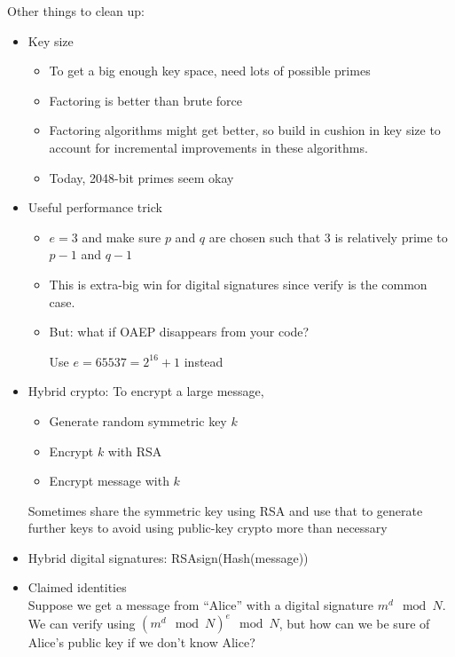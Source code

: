 Other things to clean up:
\begin{itemize}
    \item Key size
    \begin{itemize}
        \item To get a big enough key space, need lots of possible primes
        \item Factoring is better than brute force
        \item Factoring algorithms might get better, so build in cushion in key
            size to account for incremental improvements in these algorithms.
        \item Today, 2048-bit primes seem okay
    \end{itemize}
    \item Useful performance trick
    \begin{itemize}
        \item $e = 3$ and make sure $p$ and $q$ are chosen
    such that 3 is relatively prime to $p-1$ and $q-1$
        \item This is extra-big win
    for digital signatures since verify is the common case.
        \item But: what if OAEP disappears from your code?

        Use $e=65537=2^{16} + 1$ instead
    \end{itemize}
    \item Hybrid crypto: To encrypt a large message,
    \begin{itemize}
        \item Generate random symmetric key $k$
        \item Encrypt $k$ with RSA
        \item Encrypt message with $k$
    \end{itemize}
        Sometimes share the symmetric key using RSA and use that to generate
        further keys to avoid using public-key crypto more than necessary
    \item Hybrid digital signatures: RSAsign(Hash(message))
    \item Claimed identities\\
        Suppose we get a message from ``Alice'' with a digital signature $m^d
        \mod N$. We can verify using $(m^d \mod N)^e \mod N$, but how can we be
        sure of Alice's public key if we don't know Alice?


\end{itemize}
